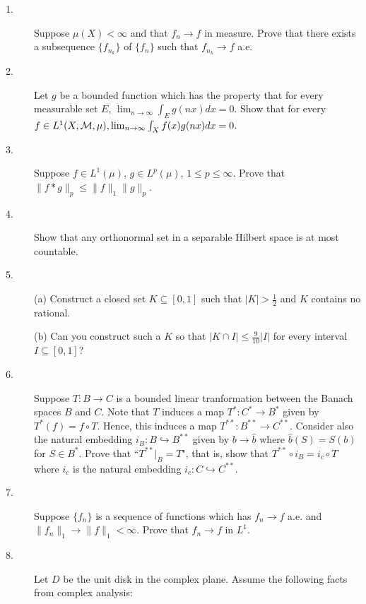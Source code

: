 \documentclass{article}
\begin{document}
\begin{description}
\item[1.]
Suppose $\mu(X) < \infty$ and that $f_n \to f$ in measure. Prove that there
exists a subsequence $\{ f_{n_k} \}$ of $\{f_n\}$ such that $f_{n_k} \to f$
a.e.

\item[2.]
Let $g$ be a bounded function which has the property that for every measurable
set $E$, $\lim_{n\to \infty} \int_E g(nx) dx =0$. Show that for every
$f \in L^1 (X, {\cal M}, \mu), \lim_{n \to \infty} \int_X f(x) g(nx) dx =0$.

\item[3.]
Suppose $f \in L^1 (\mu)$, $g \in L^p (\mu)$, $1 \leq p \leq \infty$. Prove
that
$\parallel f \ast g \parallel_p \leq \parallel f \parallel_1 \parallel g
  \parallel_p$.

\item[4.]
Show that any orthonormal set in a separable Hilbert space is at most
countable.

\item[5.] (a)
Construct a closed set $K \subseteq [0,1]$ such that $|K| > \frac{1}{2}$ and
$K$ contains no rational.

\item[\quad] (b)
Can you construct such a $K$ so that $|K \cap I| \leq \frac{9}{10} |I|$
for every interval $I \subseteq [0,1]$?

\item[6.]
Suppose $T:B \to C$ is a bounded linear tranformation between the Banach
spaces $B$ and $C$. Note that $T$ induces a map $T^\ast : C^\ast \to B^\ast$
given by $T^\ast (f) = f \circ T$. Hence, this induces a map
$T^{\ast \ast} : B^{\ast \ast} \to C^{\ast \ast}$. Consider also the natural
embedding $i_B : B \hookrightarrow B^{\ast \ast}$ given by $b \to \widehat b$
where $\widehat b (S) = S(b)$ for $S \in B^\ast$. Prove that
``$T^{\ast \ast} |_B = T$", that is, show that
$T^{\ast \ast} \circ i_B = i_c \circ T$ where $i_c$ is the natural embedding
$i_c :C \hookrightarrow C^{\ast \ast}$.

\item[7.]
Suppose $\{f_n\}$ is a sequence of functions which has $f_n \to f$ a.e. and
$\parallel f_n \parallel_1 \to \parallel f \parallel_1 < \infty$. Prove
that $f_n \to f$ in $L^1$.

\item[8.]
Let $D$ be the unit disk in the complex plane. Assume the following facts
from complex analysis:


\end{description}
\end{document}
